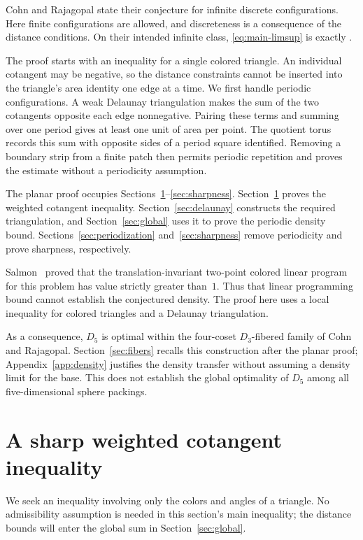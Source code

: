 \documentclass[11pt,a4paper]{article}
\theoremstyle{definition}
\theoremstyle{remark}
\begin{document}
Cohn and Rajagopal state their conjecture for infinite discrete
configurations. Here finite configurations are allowed, and discreteness
is a consequence of the distance conditions. On their intended infinite
class, \eqref{eq:main-limsup} is exactly
\cite[Conjecture~4.1]{CR}.

The proof starts with an inequality for a single colored triangle. An
individual cotangent may be negative, so the distance constraints cannot be
inserted into the triangle's area identity one edge at a time. We first
handle periodic configurations. A weak Delaunay triangulation makes the
sum of the two cotangents opposite each edge nonnegative. Pairing these
terms and summing over one period gives at least one unit of area per
point. The quotient torus records this sum with opposite sides of a
period square identified. Removing a boundary strip from a finite patch
then permits periodic repetition and proves the estimate without a
periodicity assumption.

The planar proof occupies Sections~\ref{sec:local}--\ref{sec:sharpness}.
Section~\ref{sec:local} proves the weighted cotangent inequality.
Section~\ref{sec:delaunay} constructs the required triangulation, and
Section~\ref{sec:global} uses it to prove the periodic density bound.
Sections~\ref{sec:periodization} and~\ref{sec:sharpness} remove periodicity
and prove sharpness, respectively.

Salmon~\cite[Theorem~26]{Salmon} proved that the
translation-invariant two-point colored linear program for this problem
has value strictly greater than~$1$. Thus that linear programming bound
cannot establish the conjectured density. The proof here uses a local
inequality for colored triangles and a Delaunay triangulation.

As a consequence, $D_5$ is optimal within the four-coset $D_3$-fibered
family of Cohn and Rajagopal. Section~\ref{sec:fibers} recalls this
construction after the planar proof; Appendix~\ref{app:density}
justifies the density transfer without assuming a density limit for the
base. This does not establish the global optimality of $D_5$ among all
five-dimensional sphere packings.

\section{A sharp weighted cotangent inequality}
\label{sec:local}

We seek an inequality involving only the colors and angles of a
triangle. No admissibility assumption is needed in this section's main
inequality; the distance bounds will enter the global sum in
Section~\ref{sec:global}.
\end{document}
